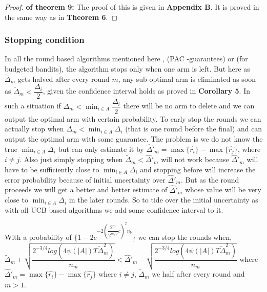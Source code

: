 \begin{proof}\textbf{ of theorem 9:}
The proof of this is given in \textbf{Appendix B}. It is proved in the same way as in \textbf{Theorem 6}.
\end{proof}


\subsubsection{Stopping condition}


In all the round based algorithms mentioned here \citep{auer2010ucb}, \citep{even2006action} (PAC -guarantees) or \citep{audibert2009exploration} (for budgeted bandits), the algorithm stops only when one  arm is left. But here as $\tilde{\Delta}_{m}$ gets halved after every round $m$, any sub-optimal arm is eliminated as soon as $\tilde{\Delta}_{m} < \dfrac{\Delta_{i}}{2}$, given the confidence interval holds as proved in \textbf{Corollary 5}. In such a situation if $\tilde{\Delta}_{m} < \min_{i\in A}\dfrac{{\Delta_{i}}}{2}$ there will be no arm to delete and we can output the optimal arm with certain probability. To early stop the rounds we can actually stop when $\tilde{\Delta}_{m} < \min_{i\in A}{\Delta_{i}}$ (that is one round before the final) and can output the optimal arm with some guarantee. The problem is we do not know the true $\min_{i\in A}{\Delta_{i}}$ but can only estimate it by $\hat{\Delta}'_{m}=\max\lbrace\hat{r_{i}}\rbrace-\max\lbrace\hat{r_{j}}\rbrace$, where $i\neq j $. Also just simply stopping when $\tilde{\Delta}_{m} < \hat{\Delta}'_{m}$ will not work because $\hat{\Delta}'_{m}$ will have to be sufficiently close to $\min_{i\in A}{\Delta_{i}}$ and stopping before will increase the error probability because of initial uncertainty over $\hat{\Delta}'_{m}$. But as the round proceeds we will get a better and better estimate of $\hat{\Delta}'_{m}$ whose value will be very close to $\min_{i\in A}{\Delta_{i}}$ in the later rounds. So to tide over the initial uncertainty as with all UCB based algorithms we add some confidence interval to it.

\begin{theorem}
With a probability of $\lbrace 1 - 2e^{-2(\dfrac{2^{m}}{2^{m/2}}c)^{2} n_{b}}\rbrace$ we can stop the rounds when, $\tilde{\Delta}_{m} + \sqrt{\dfrac{2^{-3/4} log({4\psi(|A|)T\tilde{\Delta}_{m}^{2}})}{n_{m}}} < \hat{\Delta}'_{m} - \sqrt{\dfrac{2^{-3/4} log({4\psi(|A|)T\tilde{\Delta}_{m}^{2}})}{n_{m}}}$ where $\hat{\Delta}'_{m}=\max\lbrace\hat{r_{i}}\rbrace-\max\lbrace\hat{r_{j}}\rbrace$ where $i\neq j $, $\tilde{\Delta}_{m}$ we half after every round and $m>1$.
\end{theorem}


